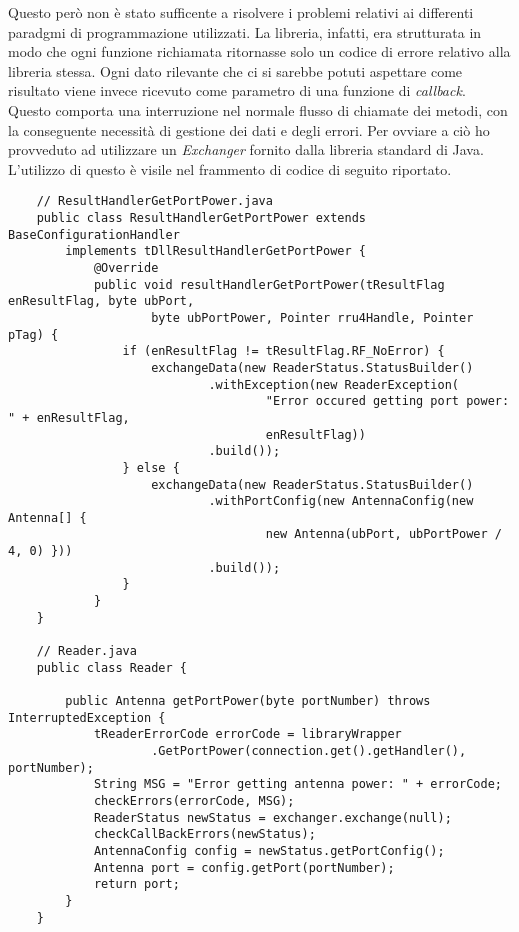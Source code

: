 \label{callback}
Questo però non è stato sufficente a risolvere i problemi relativi ai differenti paradgmi di programmazione utilizzati. La libreria, infatti, era strutturata
in modo che ogni funzione richiamata ritornasse solo un codice di errore relativo alla libreria stessa. Ogni dato rilevante che ci si sarebbe potuti
aspettare come risultato viene invece ricevuto come parametro di una funzione di \emph{callback}. Questo comporta una interruzione nel normale flusso di
chiamate dei metodi, con la conseguente necessità di gestione dei dati e degli errori.
Per ovviare a ciò ho provveduto ad utilizzare un \emph{Exchanger} fornito dalla libreria standard di Java. 
L'utilizzo di questo è visile nel frammento di codice di seguito riportato.

\begin{lstlisting}
    // ResultHandlerGetPortPower.java
    public class ResultHandlerGetPortPower extends BaseConfigurationHandler 
        implements tDllResultHandlerGetPortPower {
            @Override
            public void resultHandlerGetPortPower(tResultFlag enResultFlag, byte ubPort,
                    byte ubPortPower, Pointer rru4Handle, Pointer pTag) {
                if (enResultFlag != tResultFlag.RF_NoError) {
                    exchangeData(new ReaderStatus.StatusBuilder()
                            .withException(new ReaderException(
                                    "Error occured getting port power: " + enResultFlag,
                                    enResultFlag))
                            .build());
                } else {
                    exchangeData(new ReaderStatus.StatusBuilder()
                            .withPortConfig(new AntennaConfig(new Antenna[] {
                                    new Antenna(ubPort, ubPortPower / 4, 0) }))
                            .build());
                }
            }
    }

    // Reader.java
    public class Reader {
        
        public Antenna getPortPower(byte portNumber) throws InterruptedException {
		    tReaderErrorCode errorCode = libraryWrapper
		            .GetPortPower(connection.get().getHandler(), portNumber);
		    String MSG = "Error getting antenna power: " + errorCode;
		    checkErrors(errorCode, MSG);
		    ReaderStatus newStatus = exchanger.exchange(null);
		    checkCallBackErrors(newStatus);
		    AntennaConfig config = newStatus.getPortConfig();
		    Antenna port = config.getPort(portNumber);
		    return port;
	    }
    }
\end{lstlisting}

